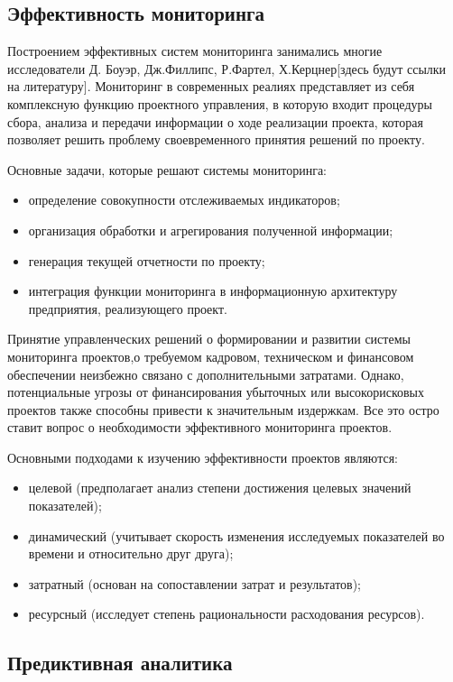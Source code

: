 \documentclass[12pt,a4paper]{article} %
\begin{document}
\subsection{Эффективность мониторинга}

Построением эффективных систем мониторинга занимались многие исследователи Д. Боуэр, Дж.Филлипс, Р.Фартел, Х.Керцнер[здесь будут ссылки на литературу]. Мониторинг в современных реалиях представляет из себя комплексную функцию проектного управления, в которую входит процедуры сбора, анализа и передачи информации о ходе реализации проекта, которая позволяет решить проблему своевременного принятия решений по проекту.

Основные задачи, которые решают системы мониторинга:
\begin{itemize}
	\item определение совокупности отслеживаемых индикаторов;
	\item организация обработки и агрегирования полученной информации;
	\item генерация текущей отчетности по проекту;
	\item интеграция функции мониторинга в информационную архитектуру предприятия, реализующего проект.
\end{itemize}

Принятие управленческих решений о формировании и развитии системы мониторинга проектов,о требуемом кадровом, техническом и финансовом обеспечении неизбежно связано с дополнительными затратами. Однако, потенциальные угрозы от финансирования убыточных или высокорисковых проектов также способны привести к значительным издержкам. Все это остро ставит вопрос о необходимости эффективного мониторинга проектов.

Основными подходами к изучению эффективности проектов являются:
\begin{itemize}
	\item целевой (предполагает анализ степени достижения целевых значений показателей);
	\item динамический (учитывает скорость изменения исследуемых показателей во времени и относительно друг друга);
	\item затратный (основан на сопоставлении затрат и результатов);
	\item ресурсный (исследует степень рациональности расходования ресурсов).
\end{itemize}

\subsection{Предиктивная аналитика}
\end{document}
